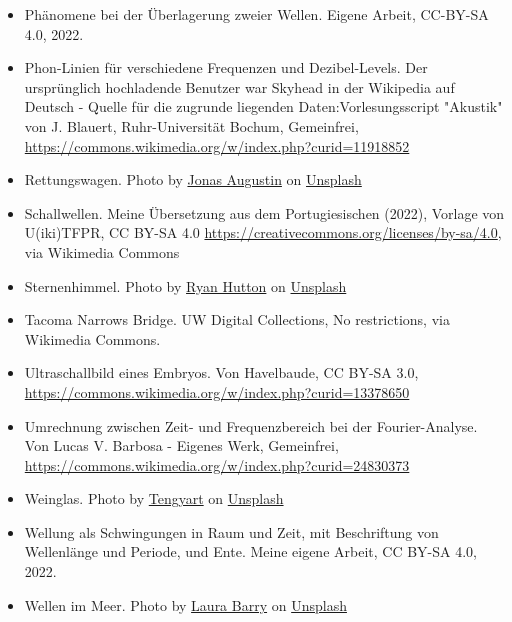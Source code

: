 \documentclass{beamer}
\begin{document}
\begin{frame}
\begin{tiny}
\begin{itemize}
\item
Phänomene bei der Überlagerung zweier Wellen. Eigene Arbeit, CC-BY-SA 4.0, 2022.

\item
Phon-Linien für verschiedene Frequenzen und Dezibel-Levels. Der ursprünglich hochladende Benutzer war Skyhead in der Wikipedia auf Deutsch - Quelle für die zugrunde liegenden Daten:Vorlesungsscript "Akustik" von J. Blauert, Ruhr-Universität Bochum, Gemeinfrei, \url{https://commons.wikimedia.org/w/index.php?curid=11918852}

\item
Rettungswagen. Photo by \href{https://unsplash.com/@augustinfoto?utm_source=unsplash&utm_medium=referral&utm_content=creditCopyText}{Jonas Augustin} on \href{https://unsplash.com/s/photos/krankenwagen?utm_source=unsplash&utm_medium=referral&utm_content=creditCopyText}{Unsplash}


\item
Schallwellen. Meine Übersetzung aus dem Portugiesischen (2022), Vorlage von U(iki)TFPR, CC BY-SA 4.0 \url{https://creativecommons.org/licenses/by-sa/4.0}, via Wikimedia Commons

\item
Sternenhimmel. Photo by \href{https://unsplash.com/@ryan_hutton_?utm_source=unsplash&utm_medium=referral&utm_content=creditCopyText}{Ryan Hutton} on \href{https://unsplash.com/s/photos/stars?utm_source=unsplash&utm_medium=referral&utm_content=creditCopyText}{Unsplash}

\item
Tacoma Narrows Bridge. UW Digital Collections, No restrictions, via Wikimedia Commons.

\item
Ultraschallbild eines Embryos. Von Havelbaude, CC BY-SA 3.0, \url{https://commons.wikimedia.org/w/index.php?curid=13378650}

\item
Umrechnung zwischen Zeit- und Frequenzbereich bei der Fourier-Analyse. Von Lucas V. Barbosa - Eigenes Werk, Gemeinfrei, \url{https://commons.wikimedia.org/w/index.php?curid=24830373}

\item
Weinglas. Photo by \href{https://unsplash.com/@tengyart?utm_source=unsplash&utm_medium=referral&utm_content=creditCopyText}{Tengyart} on \href{https://unsplash.com/s/photos/empty-wine-glass?utm_source=unsplash&utm_medium=referral&utm_content=creditCopyText}{Unsplash}

\item
Wellung als Schwingungen in Raum und Zeit, mit Beschriftung von Wellenlänge und Periode, und Ente. Meine eigene Arbeit, CC BY-SA 4.0, 2022. 

\item
Wellen im Meer. Photo by \href{https://unsplash.com/@lauraashtonashley?utm_source=unsplash&utm_medium=referral&utm_content=creditCopyText}{Laura Barry} on \href{https://unsplash.com/s/photos/waves?utm_source=unsplash&utm_medium=referral&utm_content=creditCopyText}{Unsplash}
  

\end{itemize}
\end{tiny}
\end{frame}
\end{document}
